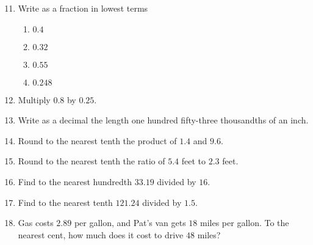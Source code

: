\documentclass[12pt]{article}
\begin{document}
  \vspace{0.25in}
\begin{enumerate}
\setcounter{enumi}{10}
		\newcommand{\spacing}{\vspace{0.60in}}
\item Write as a fraction in lowest terms 
\begin{multicols}{2}
\begin{enumerate}

\item \hspace{0.25in} $0.4$ 
  \vspace{0.25in}
  
\item \hspace{0.25in} $0.32$ 
  \vspace{0.25in}

\item \hspace{0.25in} $0.55$ 
  \vspace{0.25in}

\item \hspace{0.25in} $0.248$ 
  \vspace{0.25in}

\end{enumerate}
\end{multicols}
  \vspace{0.25in}

\item Multiply $0.8$ by $0.25$. 
\spacing

\item Write as a decimal the length one hundred fifty-three thousandths of an inch. 
\spacing

\item Round to the nearest tenth the product of $1.4$ and $9.6$. 
\spacing

\item Round to the nearest tenth the ratio of $5.4$ feet to $2.3$ feet.  
\spacing

\item Find to the nearest hundredth $33.19$ divided by $16$.  
\spacing

\item Find to the nearest tenth $121.24$ divided by $1.5$.  
\spacing

\item Gas costs $2.89$ per gallon, and Pat's van gets $18$ miles per gallon. To the nearest cent, how much does it cost to drive $48$ miles? 
\spacing


\end{enumerate}
\end{document}
